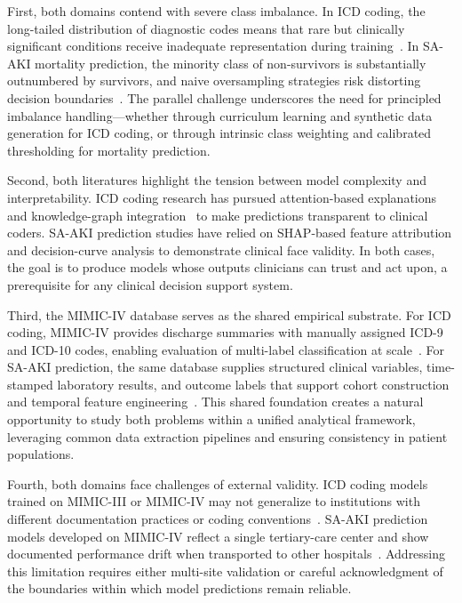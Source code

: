 First, both domains contend with severe class imbalance. In ICD coding, the long-tailed distribution of diagnostic codes means that rare but clinically significant conditions receive inadequate representation during training~\citep{rios2018few, nguyen2023mimicivicd}. In SA-AKI mortality prediction, the minority class of non-survivors is substantially outnumbered by survivors, and naive oversampling strategies risk distorting decision boundaries~\citep{Chawla_2002, Krawczyk_2016}. The parallel challenge underscores the need for principled imbalance handling---whether through curriculum learning and synthetic data generation for ICD coding, or through intrinsic class weighting and calibrated thresholding for mortality prediction.

Second, both literatures highlight the tension between model complexity and interpretability. ICD coding research has pursued attention-based explanations~\citep{mullenbach2018explainable} and knowledge-graph integration~\citep{teng2020explainable} to make predictions transparent to clinical coders. SA-AKI prediction studies have relied on SHAP-based feature attribution and decision-curve analysis to demonstrate clinical face validity. In both cases, the goal is to produce models whose outputs clinicians can trust and act upon, a prerequisite for any clinical decision support system.

Third, the MIMIC-IV database serves as the shared empirical substrate. For ICD coding, MIMIC-IV provides discharge summaries with manually assigned ICD-9 and ICD-10 codes, enabling evaluation of multi-label classification at scale~\citep{johnson2023mimicivscidata}. For SA-AKI prediction, the same database supplies structured clinical variables, time-stamped laboratory results, and outcome labels that support cohort construction and temporal feature engineering~\citep{Johnson_2023_MIMIC}. This shared foundation creates a natural opportunity to study both problems within a unified analytical framework, leveraging common data extraction pipelines and ensuring consistency in patient populations.

Fourth, both domains face challenges of external validity. ICD coding models trained on MIMIC-III or MIMIC-IV may not generalize to institutions with different documentation practices or coding conventions~\citep{edin2023automated}. SA-AKI prediction models developed on MIMIC-IV reflect a single tertiary-care center and show documented performance drift when transported to other hospitals~\citep{Rockenschaub_2024}. Addressing this limitation requires either multi-site validation or careful acknowledgment of the boundaries within which model predictions remain reliable.

